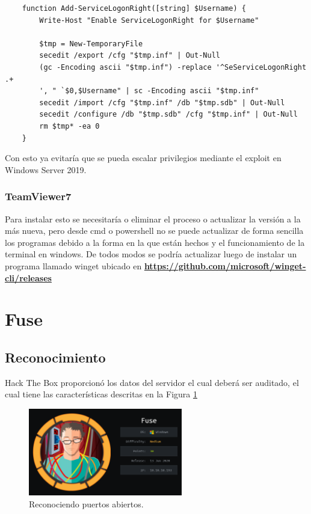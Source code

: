 \documentclass{article}
\begin{document}
\begin{lstlisting}
	function Add-ServiceLogonRight([string] $Username) {
		Write-Host "Enable ServiceLogonRight for $Username"
	
		$tmp = New-TemporaryFile
		secedit /export /cfg "$tmp.inf" | Out-Null
		(gc -Encoding ascii "$tmp.inf") -replace '^SeServiceLogonRight .+
		', " `$0,$Username" | sc -Encoding ascii "$tmp.inf"
		secedit /import /cfg "$tmp.inf" /db "$tmp.sdb" | Out-Null
		secedit /configure /db "$tmp.sdb" /cfg "$tmp.inf" | Out-Null
		rm $tmp* -ea 0
	}
\end{lstlisting}	

Con esto ya evitaría que se pueda escalar privilegios mediante el exploit en Windows Server 2019.

\subsubsection{TeamViewer7}

Para instalar esto se necesitaría o eliminar el proceso o actualizar la versión a la más nueva, pero desde cmd o powershell no se puede actualizar de forma sencilla los programas debido a la forma en la que están hechos y el funcionamiento de la terminal en windows.
De todos modos se podría actualizar luego de instalar un programa llamado winget ubicado en \textbf{\href{https://github.com/microsoft/winget-cli/releases}{https://github.com/microsoft/winget-cli/releases}}


\clearpage
\section{Fuse}
\subsection{Reconocimiento}

Hack The Box proporcionó los datos del servidor el cual deberá ser auditado, el cual tiene las características descritas en la Figura \ref{fuse_logo}

\begin{figure}[h]
	\center
	\includegraphics[width=0.6\textwidth]{images/fuse/fuse_logo.png}
	\caption{Reconociendo puertos abiertos.}
	\label{fuse_logo}
\end{figure}
\end{document}
